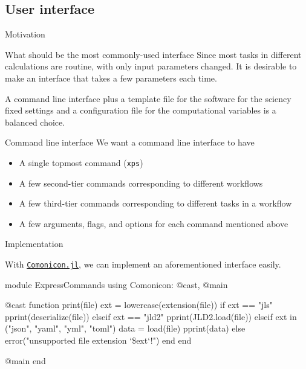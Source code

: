 \subsection{User interface}

\begin{frame}{Motivation}

    \begin{block}{What should be the most commonly-used interface}
        Since most tasks in different \ab{} calculations are routine, with only
        input parameters changed. It is desirable to make an interface that takes a few
        parameters each time.

        A command line interface plus a template file for the \ab{} software for the sciency
        fixed settings and a configuration file for the computational variables is a
        balanced choice.
    \end{block}

    \begin{block}{Command line interface}
        We want a command line interface to have

        \begin{itemize}
            \item A single topmost command (\texttt{xps})
            \item A few second-tier commands corresponding to different workflows
            \item A few third-tier commands corresponding to different tasks in a workflow
            \item A few arguments, flags, and options for each command mentioned above
        \end{itemize}
    \end{block}

\end{frame}

\begin{frame}[fragile]{Implementation}

    With \href{https://github.com/comonicon/Comonicon.jl}{\texttt{Comonicon.jl}}, we can implement
    an aforementioned interface easily.
    {\scriptsize
        \begin{algorithmblock}
            \begin{juliaverbatim}
module ExpressCommands
using Comonicon: @cast, @main

@cast function print(file)
    ext = lowercase(extension(file))
    if ext == "jls"
        pprint(deserialize(file))
    elseif ext == "jld2"
        pprint(JLD2.load(file))
    elseif ext in ("json", "yaml", "yml", "toml")
        data = load(file)
        pprint(data)
    else
        error("unsupported file extension `\$ext`!")
    end
end

@main
end
            \end{juliaverbatim}
        \end{algorithmblock}
    }

\end{frame}
